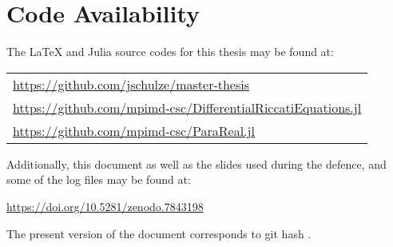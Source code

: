 \section*{Code Availability}

The \LaTeX{} and Julia source codes for this thesis may be found at:
\begin{center}
\begin{tabular}{l}
  \url{https://github.com/jschulze/master-thesis} \\
  \url{https://github.com/mpimd-csc/DifferentialRiccatiEquations.jl} \\
  \url{https://github.com/mpimd-csc/ParaReal.jl}
\end{tabular}
\end{center}
Additionally, this document as well as the slides used during the defence,
and some of the log files may be found at:
\begin{center}
  \url{https://doi.org/10.5281/zenodo.7843198}
\end{center}
The present version of the document corresponds to git hash
\code{}\unskip.
